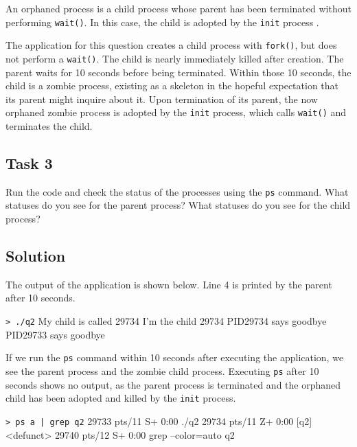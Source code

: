 \documentclass[../main.tex]{subfiles}
\begin{document}
An orphaned process is a child process whose parent has been terminated without performing \lstinline{wait()}. In this case, the child is adopted by the \lstinline{init} process \cite{love} \cite{kerrisk}.

The application for this question creates a child process with \lstinline{fork()}, but does not perform a \lstinline{wait()}. The child is nearly immediately killed after creation. The parent waits for 10 seconds before being terminated. Within those 10 seconds, the child is a zombie process, existing as a skeleton in the hopeful expectation that its parent might inquire about it. Upon termination of its parent, the now orphaned zombie process is adopted by the \lstinline{init} process, which calls \lstinline{wait()} and terminates the child.

\subsection{Task 3}

Run the code and check the status of the processes using the \lstinline{ps} command. What statuses do you see for the parent process? What statuses do you see for the child process? 

\subsection*{Solution}

The output of the application is shown below. Line 4 is printed by the parent after 10 seconds.

\begin{mintedterminal}{\lstinline{> ./q2}}
My child is called 29734
I'm the child 29734
PID29734 says goodbye
PID29733 says goodbye
\end{mintedterminal}

If we run the \lstinline{ps} command within 10 seconds after executing the application, we see the parent process and the zombie child process. Executing \lstinline{ps} after 10 seconds shows no output, as the parent process is terminated and the orphaned child has been adopted and killed by the \lstinline{init} process.

\begin{mintedterminal}{\lstinline{> ps a | grep q2}}
29733 pts/11   S+     0:00 ./q2
29734 pts/11   Z+     0:00 [q2] <defunct>
29740 pts/12   S+     0:00 grep --color=auto q2
\end{mintedterminal}

\newpage
\end{document}
